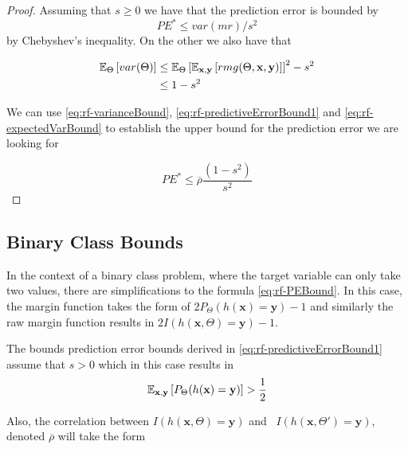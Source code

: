 \begin{appendices}
\begin{proof}
	Assuming that $s \geq 0$ we have that the prediction error is bounded by
	\begin{equation}\label{eq:rf-predictiveErrorBound1}
	PE^* \leq var(mr)/s^2
	\end{equation}
	by Chebyshev's inequality.
	On the other we also have that

	\begin{equation}\label{eq:rf-expectedVarBound}
	\begin{split}
	\operatorname{\mathbb{E}}_{\Theta} \left[ var(\Theta) \right] & \leq \operatorname{\mathbb{E}}_{\Theta} {\left[ \operatorname{\mathbb{E}}_{\textbf{x},\textbf{y}}\left[ rmg(\Theta,\textbf{x},\textbf{y})  \right] \right]}^2 -s^2 \\
	& \leq 1-s^2
	\end{split}
	\end{equation}



	We can use \cref{eq:rf-varianceBound}, \cref{eq:rf-predictiveErrorBound1} and \cref{eq:rf-expectedVarBound} to establish the upper bound for the prediction error we are looking for

	\begin{equation}
	PE^* \leq \overline{\rho}\frac{(1-s^2)}{s^2}
	\end{equation}

\end{proof}

\subsection{Binary Class Bounds}\label{appx:subsec:random_forests_binary_class}

In the context of a binary class problem, where the target variable can only take two values, there are simplifications to the formula \cref{eq:rf-PEBound}.
In this case, the margin function takes the form of $2 P_{\Theta}(h(\textbf{x}) = \textbf{y}) -1$ and similarly the raw margin function results in $2 I(h(\textbf{x}, \Theta) = \textbf{y}) -1$.


The bounds prediction error bounds derived in \cref{eq:rf-predictiveErrorBound1} assume that $s >0$ which in this case results in
\begin{equation}
\operatorname{\mathbb{E}}_{\textbf{x},\textbf{y}} \left[ P_{\Theta}(h(\textbf{x}) = \textbf{y}) \right] > \frac{1}{2}
\end{equation}


Also, the correlation between $I(h(\textbf{x}, \Theta) = \textbf{y})$ and \ $I(h(\textbf{x}, \Theta') = \textbf{y})$, denoted $\overline{\rho}$ will take the form


\end{appendices}
